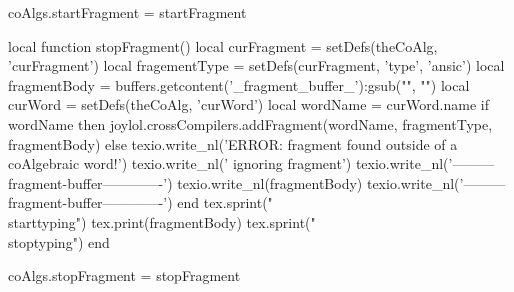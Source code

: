 coAlgs.startFragment = startFragment

local function stopFragment()
  local curFragment   = setDefs(theCoAlg, 'curFragment')
  local fragementType = setDefs(curFragment, 'type', 'ansic')
  local fragmentBody  = buffers.getcontent('_fragment_buffer_'):gsub("", "\n")
  local curWord       = setDefs(theCoAlg, 'curWord')
  local wordName      = curWord.name
  if wordName then
    joylol.crossCompilers.addFragment(wordName, fragmentType, fragmentBody)
  else
    texio.write_nl('ERROR: fragment found outside of a coAlgebraic word!')
    texio.write_nl('       ignoring fragment')
    texio.write_nl('---------fragment-buffer-------------')
    texio.write_nl(fragmentBody)
    texio.write_nl('---------fragment-buffer-------------')
  end
  tex.sprint("\\starttyping")
  tex.print(fragmentBody)
  tex.sprint("\\stoptyping")
end

coAlgs.stopFragment = stopFragment
\stopLuaCode

\stopTestSuite
